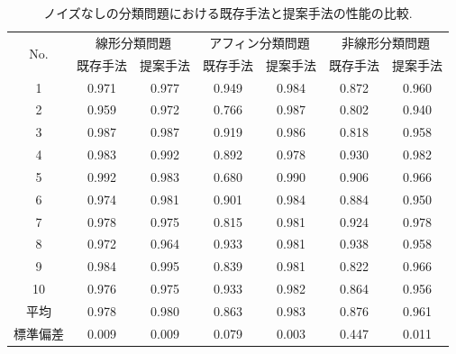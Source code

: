 \documentclass[11pt,oneside,openany,report]{jsbook}
\begin{document}
\begin{table}[tbp]
  \caption{ノイズなしの分類問題における既存手法と提案手法の性能の比較.}
  \label{table:exp:result:classification}
  \centering
  \begin{tabular}{|c|c|c|c|c|c|c|}
    \hline
    \multirow{2}{*}{No. } & \multicolumn{2}{c|}{線形分類問題} & \multicolumn{2}{c|}{アフィン分類問題} & \multicolumn{2}{c|}{非線形分類問題} \\
    \cline{2-7}
    & 既存手法 & 提案手法 & 既存手法 & 提案手法 & 既存手法 & 提案手法 \\
    \hline \hline
    1       & 0.971 & 0.977 & 0.949 & 0.984 & 0.872 & 0.960 \\
    2       & 0.959 & 0.972 & 0.766 & 0.987 & 0.802 & 0.940 \\
    3       & 0.987 & 0.987 & 0.919 & 0.986 & 0.818 & 0.958 \\
    4       & 0.983 & 0.992 & 0.892 & 0.978 & 0.930 & 0.982 \\
    5       & 0.992 & 0.983 & 0.680 & 0.990 & 0.906 & 0.966 \\
    6       & 0.974 & 0.981 & 0.901 & 0.984 & 0.884 & 0.950 \\
    7       & 0.978 & 0.975 & 0.815 & 0.981 & 0.924 & 0.978 \\
    8       & 0.972 & 0.964 & 0.933 & 0.981 & 0.938 & 0.958 \\
    9       & 0.984 & 0.995 & 0.839 & 0.981 & 0.822 & 0.966 \\
    10      & 0.976 & 0.975 & 0.933 & 0.982 & 0.864 & 0.956 \\
    \hline
    平均 &    0.978 & 0.980 & 0.863 & 0.983 & 0.876 & 0.961 \\
    標準偏差 & 0.009 & 0.009 & 0.079 & 0.003 & 0.447 & 0.011 \\
    \hline
  \end{tabular}
\end{table}
\end{document}

